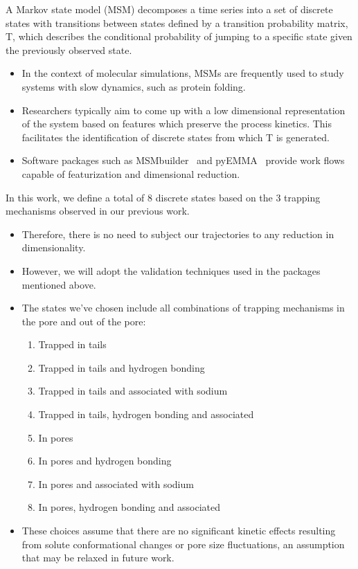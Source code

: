 \documentclass{article}
\begin{document}
  A Markov state model (MSM) decomposes a time series into a set of discrete states
  with transitions between states defined by a transition probability matrix, T,
  which describes the conditional probability of jumping to a specific 
  state given the previously observed state.~\cite{pande_everything_2010,wehmeyer_introduction_2018}
  \begin{itemize}
    \item In the context of molecular simulations, MSMs are frequently used
    to study systems with slow dynamics, such as protein folding.~\cite{snow_how_2005,chodera_automatic_2007} %
    \item Researchers typically aim to come up with a low dimensional 
    representation of the system based on features which preserve the process
    kinetics. This facilitates the identification of discrete states from
    which T is generated.
    \item Software packages such as MSMbuilder~\cite{beauchamp_msmbuilder2:_2011}
    and pyEMMA~\cite{scherer_pyemma_2015} provide work flows capable 
    of featurization and dimensional reduction.
  \end{itemize}

  In this work, we define a total of 8 discrete states based on the 3 trapping
  mechanisms observed in our previous work. 
  \begin{itemize}
  	\item Therefore, there is no need to subject our trajectories to any reduction
  	in dimensionality. 
  	\item However, we will adopt the validation techniques used in the packages
  	mentioned above.  
  	\item The states we've chosen include all combinations of trapping mechanisms 
  	in the pore and out of the pore:
  	\begin{enumerate}
  	  \item Trapped in tails
  	  \item Trapped in tails and hydrogen bonding
  	  \item Trapped in tails and associated with sodium
  	  \item Trapped in tails, hydrogen bonding and associated
  	  \item In pores
  	  \item In pores and hydrogen bonding
  	  \item In pores and associated with sodium
  	  \item In pores, hydrogen bonding and associated
  	\end{enumerate}
  	\item These choices assume that there are no significant kinetic effects resulting
  	from solute conformational changes or pore size fluctuations, an assumption 
  	that may be relaxed in future work.
  \end{itemize}
  
\end{document}
